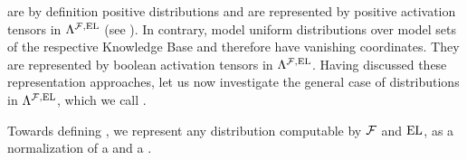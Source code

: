 \sect{\HybridLogicNetworks{}}\label{sec:hybridNetworks}

\MarkovLogicNetworks{} are by definition positive distributions and are represented by positive activation tensors in $\Lambda^{\mathcal{F},\mathrm{EL}}$ (see ).
In contrary, \HardLogicNetworks{} model uniform distributions over model sets of the respective Knowledge Base and therefore have vanishing coordinates.
They are represented by boolean activation tensors in $\Lambda^{\mathcal{F},\mathrm{EL}}$.
Having discussed these representation approaches, let us now investigate the general case of distributions in $\Lambda^{\mathcal{F},\mathrm{EL}}$, which we call \HybridLogicNetworks{}.


Towards defining \HybridLogicNetworks{}, we represent any distribution computable by $\mathcal{F}$ and $\mathrm{EL}$, as a normalization of a \HardLogicNetwork{} and a \MarkovLogicNetwork{}.

